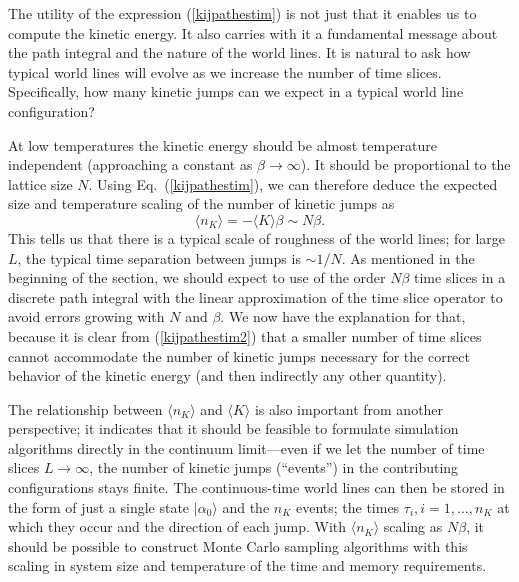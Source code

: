 \documentclass[draft,numberedheadings]{aipproc}
\begin{document}
The utility of the expression (\ref{kijpathestim}) is not just that it enables us to compute the kinetic energy. It also carries with it a fundamental message
about the path integral and the nature of the world lines. It is natural to ask how typical world lines will evolve as we increase the number of time slices. 
Specifically, how many kinetic jumps can we expect in a typical world line configuration? 

At low temperatures the kinetic energy should be almost temperature independent (approaching a constant as $\beta\to \infty$). It should be proportional to the 
lattice size $N$. Using Eq.~(\ref{kijpathestim}), we can therefore deduce the expected size and temperature scaling of the number of kinetic jumps as
\begin{equation}
\langle n_K\rangle = -\langle K\rangle \beta \sim N\beta.
\label{kijpathestim2}
\end{equation}
This tells us that there is a typical scale of roughness of the world lines; for large $L$, the typical time separation between jumps is $\sim 1/N$. 
As mentioned in the beginning of the section, we should expect to use of the order $N\beta$ time slices in a discrete path integral with the linear approximation 
of the time slice operator to avoid errors growing with $N$ and $\beta$. We now have the explanation for that, because it is clear from (\ref{kijpathestim2}) that 
a smaller number of time slices cannot accommodate the number of kinetic jumps necessary for the correct behavior of the kinetic energy (and then indirectly any 
other quantity).

The relationship between $\langle n_K\rangle$ and $\langle K\rangle$ is also important from another perspective; it indicates that it should be
feasible to formulate simulation algorithms directly in the continuum limit---even if we let the number of time slices $L \to \infty$, the number of kinetic 
jumps (``events'') in the contributing configurations stays finite. The continuous-time world lines can then be stored in the form of just a single state 
$|\alpha_0\rangle$ and the $n_K$ events; the times $\tau_i,i=1,\ldots,n_K$ at which they occur and the direction of each jump. With $\langle n_K\rangle$ scaling
as $N\beta$, it should be possible to construct Monte Carlo sampling algorithms with this scaling in system size and temperature of the time and memory requirements.
\end{document}
